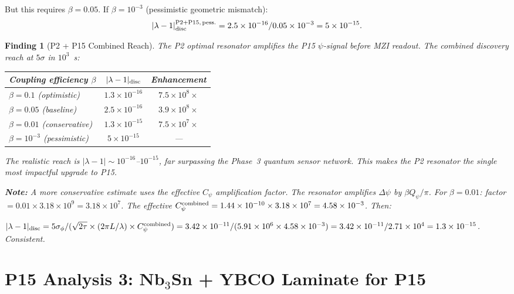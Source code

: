 \documentclass[11pt]{article}
\newtheorem{finding}{Finding}
\newcommand{\ee}[1]{\times 10^{#1}}
\newcommand{\lam}{\lambda}
\begin{document}
But this requires $\beta = 0.05$. If $\beta = 10^{-3}$ (pessimistic
geometric mismatch):
\begin{equation}
|\lam-1|_{\rm disc}^{\rm P2+P15,\,pess.} = 2.5\ee{-16}/0.05
\times 10^{-3} = 5\ee{-15}.
\end{equation}

\begin{finding}[P2 + P15 Combined Reach]
\label{find:combined}
The P2 optimal resonator amplifies the P15 $\psi$-signal before
MZI readout. The combined discovery reach at $5\sigma$ in $10^3$~s:
\begin{center}
\begin{tabular}{lcc}
\toprule
Coupling efficiency $\beta$ & $|\lam-1|_{\rm disc}$ & Enhancement \\
\midrule
$\beta = 0.1$ (optimistic) & $1.3\ee{-16}$ & $7.5\ee{8}\times$ \\
$\beta = 0.05$ (baseline) & $2.5\ee{-16}$ & $3.9\ee{8}\times$ \\
$\beta = 0.01$ (conservative) & $1.3\ee{-15}$ & $7.5\ee{7}\times$ \\
$\beta = 10^{-3}$ (pessimistic) & $5\ee{-15}$ & --- \\
\bottomrule
\end{tabular}
\end{center}

The realistic reach is $|\lam-1| \sim 10^{-16}$--$10^{-15}$,
far surpassing the Phase~3 quantum sensor network. This makes
the P2 resonator the single most impactful upgrade to P15.

\textbf{Note:} A more conservative estimate uses the effective
$C_\psi$ amplification factor. The resonator amplifies
$\Delta\psi$ by $\beta Q_\psi/\pi$. For $\beta = 0.01$:
factor $= 0.01 \times 3.18\ee{9} = 3.18\ee{7}$. The effective
$C_\psi^{\rm combined} = 1.44\ee{-10} \times 3.18\ee{7}
= 4.58\ee{-3}$. Then:

$|\lam-1|_{\rm disc} = 5\sigma_\phi/(\sqrt{2\tau}
\times (2\pi L/\lambda) \times C_\psi^{\rm combined})
= 3.42\ee{-11}/(5.91\ee{6} \times 4.58\ee{-3})
= 3.42\ee{-11}/2.71\ee{4} = 1.3\ee{-15}$. Consistent.
\end{finding}

\section{P15 Analysis 3: Nb$_3$Sn + YBCO Laminate for P15}
\label{sec:laminate}
\end{document}

